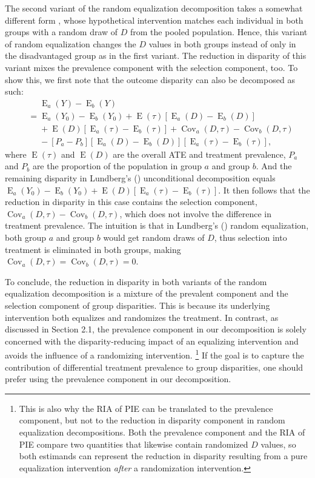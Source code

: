 \documentclass[12pt,a4paper]{article}
\newcommand{\Cov}{\operatorname{Cov}}
\newcommand{\E}{\operatorname{E}}
\begin{document}
The second variant of the random equalization decomposition takes a somewhat different form \citep{lundberg_gap-closing_2022}, whose hypothetical intervention matches each individual in both groups with a random draw of $D$ from the pooled population. Hence, this variant of random equalization changes the $D$ values in both groups instead of only in the disadvantaged group as in the first variant. The reduction in disparity of this variant  mixes the prevalence component with the selection component, too. To show this, we first note that the outcome disparity can also be decomposed as such: 
\begin{align*}
&\phantom{{}={}} \E_a(Y)-\E_b(Y) \\
&= \E_a(Y_{0})-\E_b(Y_{0}) + \E(\tau)[\E_a(D)-\E_b(D)] \\
&\phantom{{}={}} + \E(D)[ \E_a(\tau) - \E_b(\tau)] + \Cov_a(D, \tau) - \Cov_b(D, \tau) \\
&\phantom{{}={}} - [P_a-P_b][\E_a(D) - \E_b(D)][\E_a(\tau)-\E_b(\tau)], 
\end{align*} 
where $\E(\tau)$ and $\E(D)$ are the overall ATE and treatment prevalence, $P_a$ and $P_b$ are the proportion of the population in group $a$ and group $b$.
And the remaining disparity in Lundberg's (\citeyear{lundberg_gap-closing_2022}) unconditional decomposition equals 
$\E_a(Y_{0})-\E_b(Y_{0}) + \E(D)[ \E_a(\tau) - \E_b(\tau)] \nonumber$. It then follows that the reduction in disparity in this case contains the selection component, $\Cov_a(D, \tau) -  \Cov_b(D, \tau)$, which does not involve the difference in treatment prevalence. The intuition is that in Lundberg's (\citeyear{lundberg_gap-closing_2022}) random equalization, both group $a$ and group $b$ would get random draws of $D$, thus  selection into treatment is eliminated in both groups, making $\Cov_a(D,\tau)=\Cov_b(D,\tau)=0$.

To conclude, the reduction in disparity in both variants of the random equalization decomposition is a mixture of the prevalent component and the selection component of group disparities. This is because its underlying intervention both equalizes and randomizes the treatment. In contrast, as discussed in Section 2.1,  the prevalence component in our decomposition is solely concerned with the disparity-reducing impact of an equalizing intervention and avoids the influence of a randomizing intervention. \footnote{This is also why the RIA of PIE can be translated to the prevalence component, but not to the reduction in disparity component in random equalization decompositions. Both the prevalence component and the RIA of PIE compare two quantities that likewise contain randomized $D$ values, so both estimands can represent the reduction in disparity resulting from a pure equalization intervention \emph{after} a randomization intervention.} If the goal is to capture the contribution of differential treatment prevalence to group disparities, one should prefer using the prevalence component in our decomposition.
 
\end{document}
